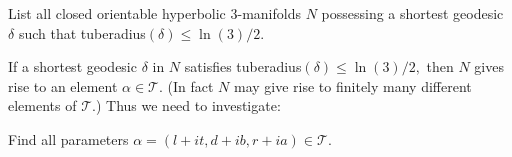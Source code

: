 \begin{problem}\label{GMT 1.14}
List all closed orientable hyperbolic $3$-manifolds $N$
possessing a shortest geodesic $\delta$ such that tuberadius$(\delta)\le \ln(3)/2.$
\end{problem}

\begin{remark}\label{GMT 1.15}
If a shortest geodesic $\delta$ in $N$ satisfies tuberadius$(\delta)\le
\ln(3)/2,$ then $N$ gives
rise to an element $\alpha\in {\mathcal T}.$  (In fact $N$ may give rise to finitely many different elements of ${\mathcal T}.$)  
Thus we need to investigate:
\end{remark}

\begin{problem}\label{GMT 1.16}
Find all parameters $\alpha=(l+it, d+ib, r+ia) \in {\mathcal T}.$ 
\end{problem}

